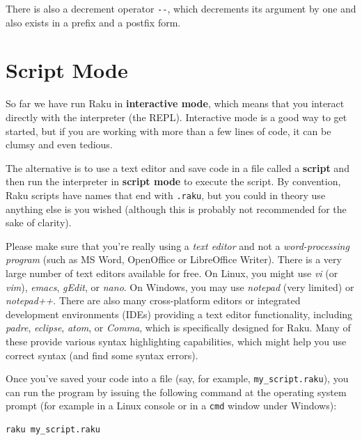 There is also a decrement operator \verb"--", which decrements its 
argument by one and also exists in a prefix and a postfix form. 



\section{Script Mode}

So far we have run Raku in {\bf interactive mode}, which
means that you interact directly with the interpreter (the 
REPL). Interactive mode is a good way to get started,
but if you are working with more than a few lines of code, 
it can be clumsy and even tedious.

The alternative is to use a text editor and save code in a file 
called a {\bf script} and then run the interpreter in {\bf script mode} 
to execute the script.  By convention, Raku scripts have names that 
end with {\tt .raku}, but you could in theory use anything else is you wished
(although this is probably not recommended for the sake of clarity).

Please make sure that you're really using a \emph{text editor} 
and not a \emph{word-processing program} (such as MS Word, 
OpenOffice or LibreOffice Writer). There is a very large 
number of text editors available for free. On Linux, you might use 
\emph{vi} (or \emph{vim}), \emph{emacs}, \emph{gEdit}, or 
\emph{nano}. On Windows, you may use \emph{notepad} (very limited) 
or \emph{notepad++}. There are also many cross-platform editors  
or integrated development environments (IDEs) providing a 
text editor functionality, including \emph{padre}, \emph{eclipse}, 
\emph{atom}, or \emph{Comma}, which is specifically designed for Raku. Many of these provide various syntax highlighting 
capabilities, which might help you use correct syntax (and 
find some syntax errors).

Once you've saved your code into a file (say, for example, 
\verb'my_script.raku'), you can run the program by issuing 
the following command at the operating system prompt (for example 
in a Linux console or in a \verb'cmd' window under Windows):
\begin{verbatim}
raku my_script.raku
\end{verbatim}


